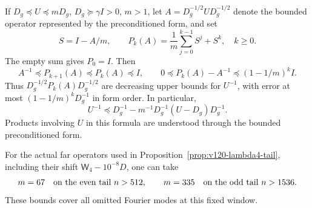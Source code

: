 \begin{proposition}
\label{prop:v120-inverse-polynomial}
If $D_g\preceq U\preceq mD_g$, $D_g\succeq\gamma I>0$,
$m>1$, let $A=D_g^{-1/2}UD_g^{-1/2}$ denote the bounded
operator represented by the preconditioned form, and set
\[
 S=I-A/m,\qquad
 P_k(A)=\frac1m\sum_{j=0}^{k-1}S^j+S^k,\quad k\ge0.
\]
The empty sum gives $P_0=I$. Then
\begin{equation}\label{eq:v120-inverse-polynomial}
 A^{-1}\preceq P_{k+1}(A)\preceq P_k(A)\preceq I,
 \qquad
 0\preceq P_k(A)-A^{-1}\preceq(1-1/m)^k I.
\end{equation}
Thus $D_g^{-1/2}P_k(A)D_g^{-1/2}$ are decreasing upper
bounds for $U^{-1}$, with error at most
$(1-1/m)^kD_g^{-1}$ in form order. In particular,
\begin{equation}\label{eq:v120-first-inverse-refinement}
 U^{-1}\preceq D_g^{-1}
       -m^{-1}D_g^{-1}(U-D_g)D_g^{-1}.
\end{equation}
Products involving $U$ in this formula are understood through the
bounded preconditioned form.

For the actual far operators used in
Proposition~\ref{prop:v120-lambda4-tail}, including their shift
$\mathsf W_4-10^{-8}D$, one can take
\[
 m=67\quad\hbox{on the even tail }n>512,\qquad
 m=335\quad\hbox{on the odd tail }n>1536.
\]
These bounds cover all omitted Fourier modes at this fixed window.
\end{proposition}
